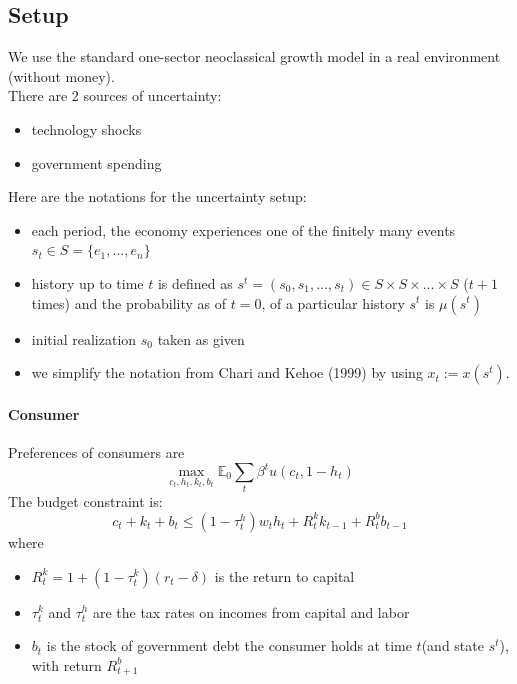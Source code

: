 \documentclass[12pt]{article}
\newcommand{\E}{\mathbb{E}}
\begin{document}
	\subsection{Setup}
		We use the standard one-sector neoclassical growth model in a real environment (without money).\\
	There are 2 sources of uncertainty:
	\begin{itemize}
		\item technology shocks
		\item government spending
	\end{itemize}
	Here are the notations for the uncertainty setup:
	\begin{itemize}
		\item each period, the economy experiences one of the finitely many events $s_t\in S = \{e_1, ..., e_n\}$
		\item history up to time $t$ is defined as $s^t = (s_0, s_1, ..., s_t)\in S\times S \times...\times S$ ($t+1$ times) and the probability as of $t=0$, of a particular history $s^t$ is $\mu(s^t)$
		\item initial realization $s_0$ taken as given
			\item we simplify the notation from Chari and Kehoe (1999) by using $x_t := x(s^t)$.
	\end{itemize}
	
	\paragraph{Consumer}
	Preferences of consumers are
	\begin{equation} \label{eq:43}
		\max_{c_t, h_t, k_t, b_t}\E_0 \sum_{t}\beta^t u(c_t, 1-h_t)
	\end{equation}
	The budget constraint is:
	\begin{equation} \label{eq:44}
		c_t + k_t + b_t \leq (1-\tau_t^h)w_t h_t + R_t^k k_{t-1} + R_t^b b_{t-1}
	\end{equation}
	where
	\begin{itemize}
		\item $R_{t}^k = 1 + (1-\tau_t^k)(r_t - \delta)$ is the return to capital
		\item $\tau_t^k$ and $\tau_t^h$ are the tax rates on incomes from capital and labor
		\item $b_t$ is the stock of government debt the consumer holds at time $t$(and state $s^t$), with return $R_{t+1}^b$
	\end{itemize}
	
\end{document}
